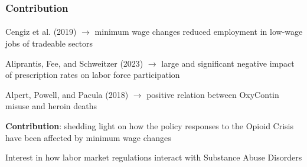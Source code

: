 \begin{frame}

    \frametitle{Contribution} %
    \framesubtitle{}  %
    \rmfamily %

    \begin{wideitemize}
        \item \textcolor{fgre}{Cengiz et al. (2019)} \(\to\) minimum wage changes reduced employment in low-wage jobs of tradeable sectors
        \item \textcolor{fgre}{Aliprantis, Fee, and Schweitzer (2023)} \(\to\) large and significant negative impact of prescription rates on labor force participation
        \item \textcolor{fgre}{Alpert, Powell, and Pacula (2018)} \(\to\) positive relation between OxyContin misuse and heroin deaths 
    \end{wideitemize}

    \vspace{9pt}
    \textbf{Contribution}: shedding light on how the policy responses to the \textcolor{fblu}{Opioid Crisis} have been affected by \textcolor{fblu}{minimum wage changes}
    \vspace{9pt}
    
    \begin{wideitemize}
        \item Interest in how \textcolor{fblu}{labor market regulations} interact with \textcolor{fblu}{Substance Abuse Disorders}
    \end{wideitemize}
    
\end{frame}

